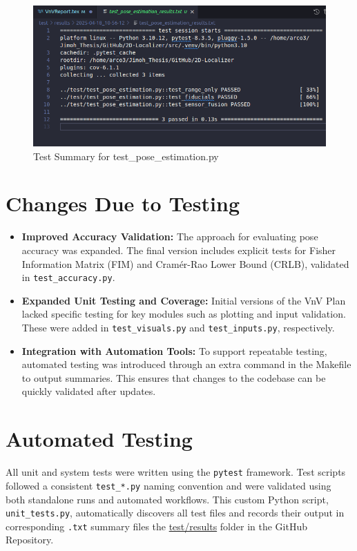 \documentclass[12pt, titlepage]{article}
\begin{document}
\begin{figure}[H]
  \centering
  \includegraphics[width=1\textwidth]{test_summary.png}
  \caption{Test Summary for test\_pose\_estimation.py}
\end{figure}

\section{Changes Due to Testing}

\begin{itemize}
  \item \textbf{Improved Accuracy Validation:} The approach for evaluating pose accuracy was expanded. The final version includes explicit tests for Fisher Information Matrix (FIM) and Cram\'er-Rao Lower Bound (CRLB), validated in \texttt{test\_accuracy.py}.

  \item \textbf{Expanded Unit Testing and Coverage:} Initial versions of the VnV Plan lacked specific testing for key modules such as plotting and input validation. These were added in \texttt{test\_visuals.py} and \texttt{test\_inputs.py}, respectively.

  \item \textbf{Integration with Automation Tools:} To support repeatable testing, automated testing was introduced through an extra command in the Makefile to output summaries. This ensures that changes to the codebase can be quickly validated after updates.
\end{itemize}

\section{Automated Testing}

All unit and system tests were written using the \texttt{pytest} framework. Test scripts followed a consistent \texttt{test\_*.py} naming convention and were validated using both standalone runs and automated workflows. This custom Python script, \texttt{unit\_tests.py}, automatically discovers all test files and records their output in corresponding \texttt{.txt} summary files the \href{https://github.com/AliyahJimoh/2D-Localizer/tree/main/test/results}{test/results} folder in the GitHub Repository.
\end{document}
